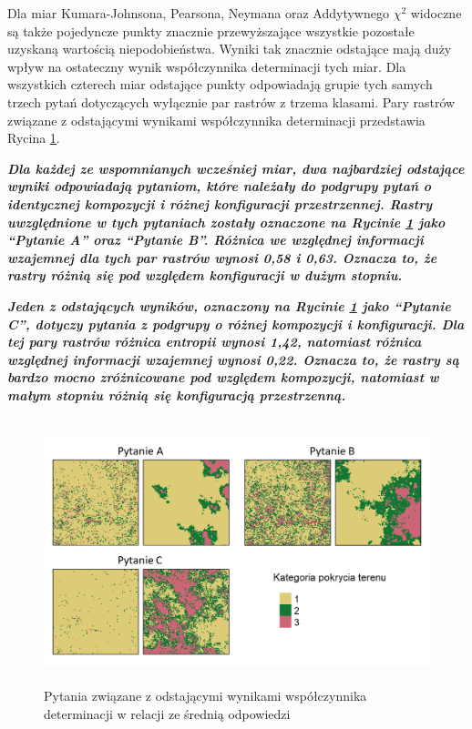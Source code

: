 \documentclass{amuthesis}
\begin{document}
Dla miar Kumara-Johnsona, Pearsona, Neymana oraz Addytywnego \(\chi^2\)
widoczne są także pojedyncze punkty znacznie przewyższające wszystkie
pozostałe uzyskaną wartością niepodobieństwa. Wyniki tak znacznie
odstające mają duży wpływ na ostateczny wynik współczynnika determinacji
tych miar. Dla wszystkich czterech miar odstające punkty odpowiadają
grupie tych samych trzech pytań dotyczących wyłącznie par rastrów z
trzema klasami. Pary rastrów związane z odstającymi wynikami
współczynnika determinacji przedstawia Rycina
\ref{fig-pyt_odstajace_kopia}.

\textbf{\emph{Dla każdej ze wspomnianych wcześniej miar, dwa najbardziej
odstające wyniki odpowiadają pytaniom, które należały do podgrupy pytań
o identycznej kompozycji i różnej konfiguracji przestrzennej. Rastry
uwzględnione w tych pytaniach zostały oznaczone na Rycinie
\ref{fig-pyt_odstajace_kopia} jako ``Pytanie A'' oraz ``Pytanie B''.
Różnica we względnej informacji wzajemnej dla tych par rastrów wynosi
0,58 i 0,63. Oznacza to, że rastry różnią się pod względem konfiguracji
w dużym stopniu.}}

\textbf{\emph{Jeden z odstających wyników, oznaczony na Rycinie
\ref{fig-pyt_odstajace_kopia} jako ``Pytanie C'', dotyczy pytania z
podgrupy o różnej kompozycji i konfiguracji. Dla tej pary rastrów
różnica entropii wynosi 1,42, natomiast różnica względnej informacji
wzajemnej wynosi 0,22. Oznacza to, że rastry są bardzo mocno
zróżnicowane pod względem kompozycji, natomiast w małym stopniu różnią
się konfiguracją przestrzenną.}}

\begin{figure}[t]

{\centering \includegraphics[width=5.10417in,height=3.04167in]{figures/pyt_odstajace_kopia.png}

}

\caption{\label{fig-pyt_odstajace_kopia}Pytania związane z odstającymi
wynikami współczynnika determinacji w relacji ze średnią odpowiedzi}

\end{figure}
\end{document}
